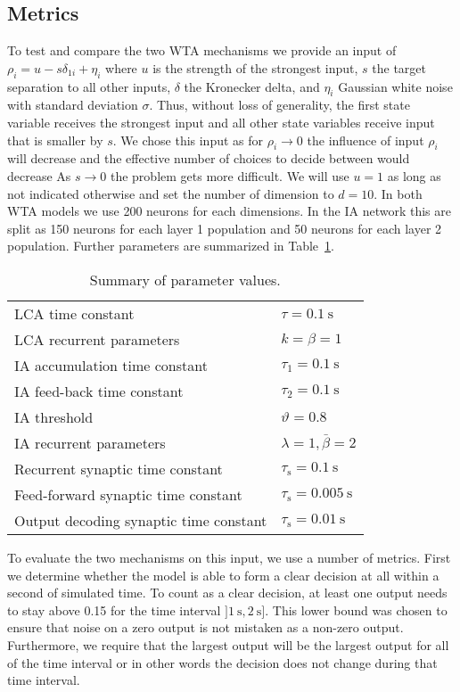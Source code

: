 \documentclass[10pt,letterpaper]{article}
\begin{document}
\subsection{Metrics}
To test and compare the two WTA mechanisms we provide an input of $\rho_i 
= u - s \delta_{1i} + \eta_i$ where $u$ is the strength of the strongest input, 
$s$ the target separation to all other inputs, $\delta$ the Kronecker delta, and 
$\eta_i$ Gaussian white noise with standard deviation $\sigma$. Thus, without 
loss of generality, the first state variable receives the strongest input and 
all other state variables receive input that is smaller by $s$. We chose this 
input as for $\rho_i \rightarrow 0$ the influence of input $\rho_i$ will 
decrease and the effective number of choices to decide between would decrease  
As $s \rightarrow 0$ the problem gets more difficult. We will use $u = 1$ as 
long as not indicated otherwise and set the number of dimension to $d = 10$.  In 
both WTA models we use 200 neurons for each dimensions. In the IA network this 
are split as 150 neurons for each layer 1 population and 50 neurons for each 
layer 2 population. Further parameters are summarized in Table~\ref{tbl:params}.
\begin{table}
    \caption{Summary of parameter values.}\label{tbl:params}
    \begin{tabular}{ll}
        LCA time constant & $\tau = \SI{0.1}{\second}$ \\
        LCA recurrent parameters & $k = \beta = 1$ \\
        IA accumulation time constant & $\tau_1 = \SI{0.1}{\second}$ \\
        IA feed-back time constant & $\tau_2 = \SI{0.1}{\second}$ \\
        IA threshold & $\vartheta = 0.8$ \\
        IA recurrent parameters & $\lambda = 1, \bar{\beta} = 2$ \\
        Recurrent synaptic time constant & $\tau_{\mathrm{s}} 
        = \SI{0.1}{\second}$ \\
        Feed-forward synaptic time constant & $\tau_{\mathrm{s}} 
        = \SI{0.005}{\second}$ \\
        Output decoding synaptic time constant & $\tau_{\mathrm{s}} 
        = \SI{0.01}{\second}$
    \end{tabular}
\end{table}

To evaluate the two mechanisms on this input, we use a number of metrics. First 
we determine whether the model is able to form a clear decision at all within 
a second of simulated time. To count as a clear decision, at least one output 
needs to stay above 0.15 for the time interval
$]\SI{1}{\second}, \SI{2}{\second}]$. %
This lower bound was chosen to ensure that noise on a zero output is not 
mistaken as a non-zero output.  Furthermore, we require that the largest output 
will be the largest output for all of the time interval or in other words the 
decision does not change during that time interval.
\end{document}
